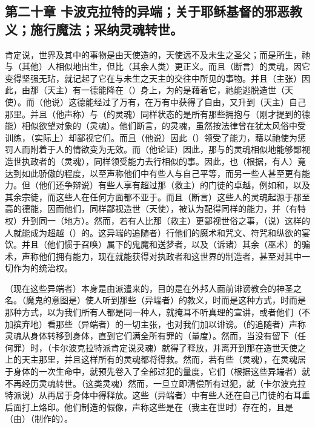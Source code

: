 \subsection{第二十章 卡波克拉特的异端；关于耶稣基督的邪恶教义；施行魔法；采纳灵魂转世。}

肯定说，世界及其中的事物是由天使造的，天使远不及未生之圣父；而是所生，祂与（其他）人相似地出生，但比（其余人类）更正义。而且（断言）的灵魂，因它变得坚强无玷，就记起了它在与未生之天主的交往中所见的事物。并且（主张）因此，由那（天主）有一德能降在（）身上，为的是藉着它，祂能逃脱造世（天使）。而（他说）这德能经过了万有，在万有中获得了自由，又升到（天主）自己那里。并且（他声称）与（的灵魂）同样状态的是所有那些拥抱与（刚才提到的德能）相似欲望对象的（灵魂）。他们断言，的灵魂，虽然按法律曾在犹太风俗中受训练，（实际上）却鄙视它们。而且（他说）因此（）领受了能力，藉以祂使为惩罚人而附着于人的情欲变为无效。而（他论证）因此，那与的灵魂相似地能够鄙视造世执政者的（灵魂），同样领受能力去行相似的事。因此，也（根据，有人）竟达到如此骄傲的程度，以至声称他们中有些人与自己平等，而另一些人甚至更有能力。但（他们还争辩说）有些人享有超过那（救主）的门徒的卓越，例如和，以及其余宗徒，而这些人在任何方面都不亚于。而且（断言）这些人的灵魂起源于那至高的德能，因而他们，同样鄙视造世（天使），被认为配得同样的能力，并（有特权）升到同一（地方）。然而，若有人比那（救主）更鄙视世俗之事，（说）这样的人就能成为超越（）的。这异端的追随者）行他们的魔术和咒文、符咒和纵欲的宴饮。并且（他们惯于召唤）属下的鬼魔和送梦者，以及（诉诸）其余（巫术）的骗术，声称他们拥有能力，现在就能获得对执政者和这世界的制造者，甚至对其中一切作为的统治权。\par

（现在这些异端者）本身是由派遣来的，目的是在外邦人面前诽谤教会的神圣之名。（魔鬼的意图是）使人听到那些（异端者）的教义，时而是这种方式，时而是那种方式，以为我们所有人都是同一种人，就掩耳不听真理的宣讲，或者他们（不加摈弃地）看那些（异端者）的一切主张，也对我们加以诽谤。（的追随者）声称灵魂从身体转移到身体，直到它们满全所有罪的（量度）。然而，当没有留下（任何罪）时，（卡尔波克拉特派肯定说灵魂）就得了释放，并离开到那在造世天使之上的天主那里，并且这样所有的灵魂都将得救。然而，若有些（灵魂），在灵魂居于身体的一次生命中，就预先卷入了全部过犯的量度，它们（根据这些异端者）就不再经历灵魂转世。（这类灵魂）然而，一旦立即清偿所有过犯，就（卡尔波克拉特派说）从再居于身体中得释放。这些（异端者）中有些人还在自己门徒的右耳垂后面打上烙印。他们制造的假像，声称这些是在（我主在世时）存在的，且是（由）（制作的）。\par


